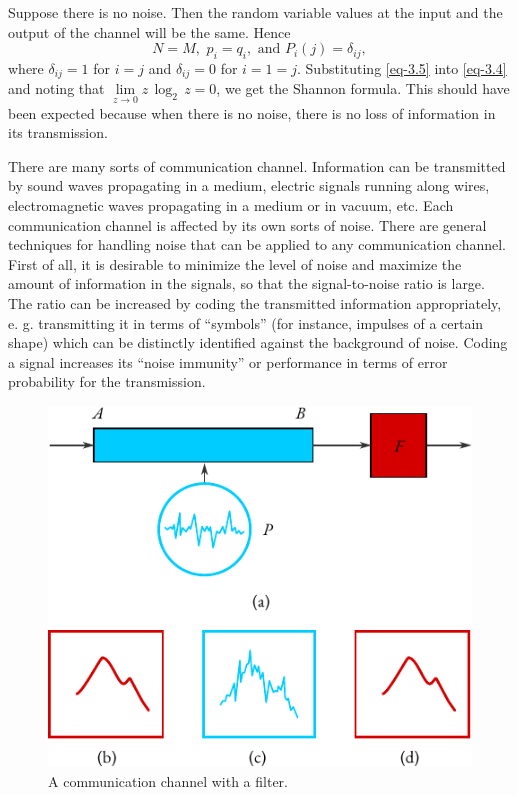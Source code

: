 Suppose there is no noise. Then the random variable values at the
input and the output of the channel will be the same. Hence
\begin{equation}%
N = M, \,\, p_{i}= q_{i}, \,\, \text{and} \,\, P_{i}(j) = \delta_{ij},
\label{eq-3.5}
\end{equation}
where $\delta_{ij}=1$ for $i = j$ and $\delta_{ij} = 0$ for $i =1= j$.
Substituting \eqref{eq-3.5} into \eqref{eq-3.4} and noting that $\lim\limits_{z \to 0} z \, \log_{2} \, z = 0$, we get the Shannon formula. This should have been expected because when there is no noise, there is no loss of information in its transmission.


 There are many
sorts of communication channel. Information can be transmitted by
sound waves propagating in a medium, electric signals running along
wires, electromagnetic waves propagating in a medium or in vacuum,
etc. Each communication channel is affected by its own sorts of noise.
There are general techniques for handling noise that can be applied to
any communication channel. First of all, it is desirable to minimize the
level of noise and maximize the amount of information in the signals, so
that the signal-to-noise ratio is large. The ratio can be increased by
coding the transmitted information appropriately, e. g. transmitting it in
terms of ``symbols'' (for instance, impulses of a certain shape) which can
be distinctly identified against the background of noise. Coding a signal
increases its ``noise immunity'' or performance in terms of error
probability for the transmission.
\begin{figure}[!ht]
 \centering
 \includegraphics[width=0.8\tfwidth]{figures/noise1.pdf}
\caption{A communication channel with a filter.\label{noise1}}
 \end{figure}
 

